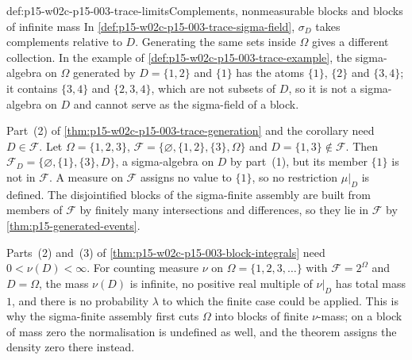\begin{hbwarning}{def:p15-w02c-p15-003-trace-limits}{Complements, nonmeasurable blocks and blocks of infinite mass}
In \cref{def:p15-w02c-p15-003-trace-sigma-field}, \(\sigma_D\) takes
complements relative to \(D\). Generating the same sets inside
\(\Omega\) gives a different collection. In the example of
\cref{def:p15-w02c-p15-003-trace-example}, the sigma-algebra on
\(\Omega\) generated by \(D=\{1,2\}\) and \(\{1\}\) has the atoms
\(\{1\}\), \(\{2\}\) and \(\{3,4\}\); it contains \(\{3,4\}\) and
\(\{2,3,4\}\), which are not subsets of \(D\), so it is not a
sigma-algebra on \(D\) and cannot serve as the sigma-field of a block.

Part~(2) of \cref{thm:p15-w02c-p15-003-trace-generation} and the
corollary need \(D\in\mathcal F\). Let \(\Omega=\{1,2,3\}\),
\(\mathcal F=\{\varnothing,\{1,2\},\{3\},\Omega\}\) and
\(D=\{1,3\}\notin\mathcal F\). Then
\(\mathcal F_D=\{\varnothing,\{1\},\{3\},D\}\), a sigma-algebra on
\(D\) by part~(1), but its member \(\{1\}\) is not in \(\mathcal F\). A
measure on \(\mathcal F\) assigns no value to \(\{1\}\), so no restriction
\(\mu|_D\) is defined. The disjointified blocks of the sigma-finite
assembly are built from members of \(\mathcal F\) by finitely many
intersections and differences, so they lie in \(\mathcal F\) by
\cref{thm:p15-generated-events}.

Parts~(2) and~(3) of \cref{thm:p15-w02c-p15-003-block-integrals} need
\(0<\nu(D)<\infty\). For counting measure \(\nu\) on
\(\Omega=\{1,2,3,\ldots\}\) with \(\mathcal F=2^\Omega\) and
\(D=\Omega\), the mass \(\nu(D)\) is infinite, no positive real
multiple of \(\nu|_D\) has total mass \(1\), and there is no
probability \(\lambda\) to which the finite case could be applied. This
is why the sigma-finite assembly first cuts \(\Omega\) into blocks of
finite \(\nu\)-mass; on a block of mass zero the normalisation is
undefined as well, and the theorem assigns the density zero there instead.
\end{hbwarning}

